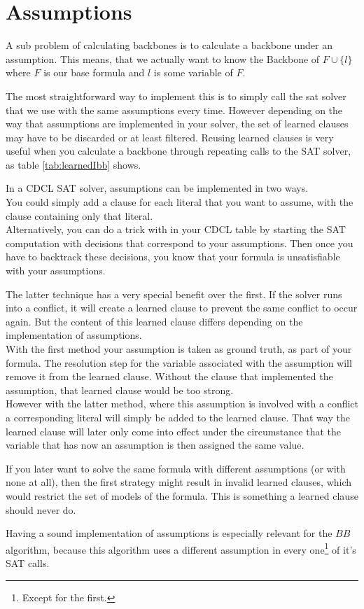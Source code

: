 \section{Assumptions}

A sub problem of calculating backbones is to calculate a backbone under an assumption. This means, that we actually want to know the Backbone of $F \cup\{l\}$ where $F$ is our base formula and $l$ is some variable of $F$.

The most straightforward way to implement this is to simply call the sat solver that we use with the same assumptions every time. However depending on the way that assumptions are implemented in your solver, the set of learned clauses may have to be discarded or at least filtered. Reusing learned clauses is very useful when you calculate a backbone through repeating calls to the SAT solver, as table \ref{tab:learnedIbb} shows.

In a CDCL SAT solver, assumptions can be implemented in two ways. \\
You could simply add a clause for each literal that you want to assume, with the clause containing only that literal. \\
Alternatively, you can do a trick with in your CDCL table by starting the SAT computation with decisions that correspond to your assumptions. Then once you have to backtrack these decisions, you know that your formula is unsatisfiable with your assumptions.

The latter technique has a very special benefit over the first. If the solver runs into a conflict, it will create a learned clause to prevent the same conflict to occur again. But the content of this learned clause differs depending on the implementation of assumptions.\\
With the first method your assumption is taken as ground truth, as part of your formula. The resolution step for the variable associated with the assumption will remove it from the learned clause. Without the clause that implemented the assumption, that learned clause would be too strong.\\
However with the latter method, where this assumption is involved with a conflict a corresponding literal will simply be added to the learned clause. That way the learned clause will later only come into effect under the circumstance that the variable that has now an assumption is then assigned the same value.

If you later want to solve the same formula with different assumptions (or with none at all), then the first strategy might result in invalid learned clauses, which would restrict the set of models of the formula. This is something a learned clause should never do.

Having a sound implementation of assumptions is especially relevant for the $BB$ algorithm, because this algorithm uses a different assumption in every one\footnote{Except for the first.} of it's SAT calls.
